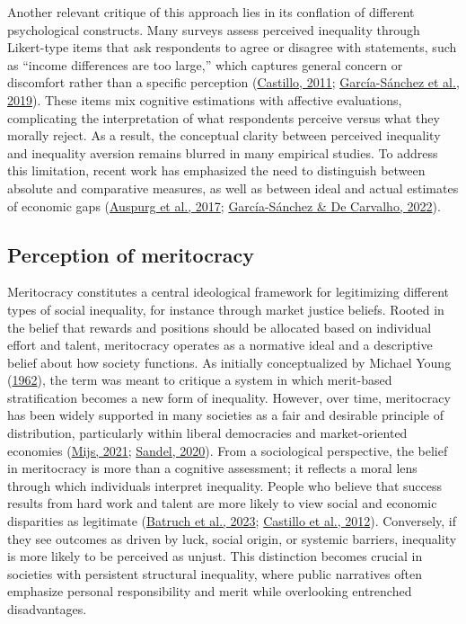 \documentclass[
  12pt,
]{article}
\begin{document}
Another relevant critique of this approach lies in its conflation of
different psychological constructs. Many surveys assess perceived
inequality through Likert-type items that ask respondents to agree or
disagree with statements, such as ``income differences are too large,''
which captures general concern or discomfort rather than a specific
perception (\protect\hyperlink{ref-Castillo2011}{Castillo, 2011};
\protect\hyperlink{ref-garcia-sanchez_vicious_2019}{García-Sánchez et
al., 2019}). These items mix cognitive estimations with affective
evaluations, complicating the interpretation of what respondents
perceive versus what they morally reject. As a result, the conceptual
clarity between perceived inequality and inequality aversion remains
blurred in many empirical studies. To address this limitation, recent
work has emphasized the need to distinguish between absolute and
comparative measures, as well as between ideal and actual estimates of
economic gaps (\protect\hyperlink{ref-auspurg_why_2017}{Auspurg et al.,
2017};
\protect\hyperlink{ref-garcia-sanchez_creencias_2022}{García-Sánchez \&
De Carvalho, 2022}).

\hypertarget{perception-of-meritocracy}{%
\subsection{Perception of meritocracy}\label{perception-of-meritocracy}}

Meritocracy constitutes a central ideological framework for legitimizing
different types of social inequality, for instance through market
justice beliefs. Rooted in the belief that rewards and positions should
be allocated based on individual effort and talent, meritocracy operates
as a normative ideal and a descriptive belief about how society
functions. As initially conceptualized by Michael Young
(\protect\hyperlink{ref-young_rise_1962}{1962}), the term was meant to
critique a system in which merit-based stratification becomes a new form
of inequality. However, over time, meritocracy has been widely supported
in many societies as a fair and desirable principle of distribution,
particularly within liberal democracies and market-oriented economies
(\protect\hyperlink{ref-mijs_paradox_2021}{Mijs, 2021};
\protect\hyperlink{ref-sandel_tyranny_2020}{Sandel, 2020}). From a
sociological perspective, the belief in meritocracy is more than a
cognitive assessment; it reflects a moral lens through which individuals
interpret inequality. People who believe that success results from hard
work and talent are more likely to view social and economic disparities
as legitimate (\protect\hyperlink{ref-batruch_belief_2023}{Batruch et
al., 2023}; \protect\hyperlink{ref-castillo_percepcion_2019}{Castillo et
al., 2012}). Conversely, if they see outcomes as driven by luck, social
origin, or systemic barriers, inequality is more likely to be perceived
as unjust. This distinction becomes crucial in societies with persistent
structural inequality, where public narratives often emphasize personal
responsibility and merit while overlooking entrenched disadvantages.
\end{document}

